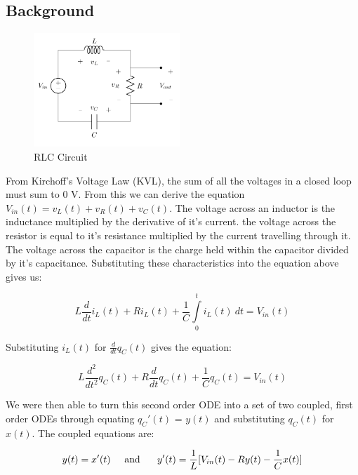 \documentclass[11pt,a4paper]{article}
\begin{document}
\subsection{Background}

\begin{figure}
\vspace{-10mm}
  		\includegraphics[width=0.49\textwidth]{Ex3_Figs/RLC.png}
\vspace{-6mm}
  	\caption{RLC Circuit}
  	\label{fig:RLC}
\end{figure}


From Kirchoff's Voltage Law (KVL), the sum of all the voltages in a closed loop must sum to 0 V. From this we can derive the equation $V_{in}(t) = v_L(t)+v_R(t)+v_C(t)$. The voltage across an inductor is the inductance multiplied by the derivative of it's current. the voltage across the resistor is equal to it's resistance multiplied by the current travelling through it. The voltage across the capacitor is the charge held within the capacitor divided by it's capacitance. Substituting these characteristics into the equation above gives us:

\[ L \frac{d}{dt}i_L(t) + R i_L(t) + \frac{1}{C}\int\limits_0^t i_L(t) \ dt = V_{in}(t)\]

Substituting $i_L(t)$ for $\frac{d}{dt}q_C(t)$ gives the equation:

\[ L \frac{d^2}{dt^2}q_C(t) + R\frac{d}{dt}q_C(t) + \frac{1}{C}q_C(t) = V_{in}(t)\]

We were then able to turn this second order ODE into a set of two coupled, first order ODEs through equating $q_C'(t)$ = $y(t)$ and substituting $q_C(t)$ for $x(t)$. The coupled equations are:

\[y(t) = x'(t) \text{\hspace{5mm}and \hspace{5mm}}y'(t) = \frac{1}{L}[V_{in}(t)  - Ry(t) - \frac{1}{C}x(t)] \]
\end{document}
